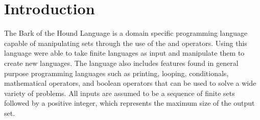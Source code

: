 \documentclass{article}
\begin{document}
\newcommand{\INT}[1]{\type{int} #1}
\newcommand{\STR}[1]{\type{str} #1}
\newcommand{\BOOL}[1]{\type{bool} #1}
\newcommand{\SET}[1]{\type{set} #1}

\newcommand{\IF}{\token {if}}
\newcommand{\ELSE}{\token {else}}
\newcommand{\THEN}{\token {then}}
\newcommand{\FI}{\token {fi}}

\newcommand{\FOR}{\token {for}}
\newcommand{\IN}{\token {in}}
\newcommand{\DO}{\token {do}}
\newcommand{\ROF}{\token {rof}}

\newcommand{\PRINT}{\token {print}}

\newcommand{\LET}{\token {let}}

\newcommand{\ASS}{\operator {$=$}}
\newcommand{\PLUS}{\operator {+}}
\newcommand{\MINUS}{\operator {-}}
\newcommand{\DIVIDE}{\operator {/}}
\newcommand{\TIMES}{\operator {*}}
\newcommand{\MOD}{\operator {\%}}

\newcommand{\INSERT}{\operator {Insert}}
\newcommand{\SETMINUS}{\operator {SetMinus}}
\newcommand{\CON}{\operator {\^{}}}

\newcommand{\TRUE}{\token {true}}
\newcommand{\FALSE}{\token {false}}

\newcommand{\LT}{\operator {$<$}}
\newcommand{\GT}{\operator {$>$}}
\newcommand{\LTE}{\operator {$<=$}}
\newcommand{\OR}{\operator {$||$}}
\newcommand{\AND}{\operator {$\&\&$}}
\newcommand{\GTE}{\operator {$>=$}}
\newcommand{\EQ}{\operator {$==$}}
\newcommand{\NEQ}{\operator {$!=$}}
\newcommand{\NOT}{\operator {$!$}}

\newcommand{\STRING}[1]{\stringlit{"#1"}}

\newcommand{\COMMENT}[1]{\comment{/*#1*/}}

\newcommand{\ERROR}[1]{\error{#1}}

\section{Introduction}

The Bark of the Hound Language is a domain specific programming language 
capable of manipulating sets through the use of the \INSERT and \SETMINUS 
operators. Using this language were able to take finite languages as input 
and manipulate them to create new languages. The language also includes 
features found in general purpose programming languages such as printing, 
looping, conditionals, mathematical operators, and boolean operators that can 
be used to solve a wide variety of problems. All inputs are assumed to be a 
sequence of finite sets followed by a positive integer, which represents the 
maximum size of the output set.\\
\end{document}

